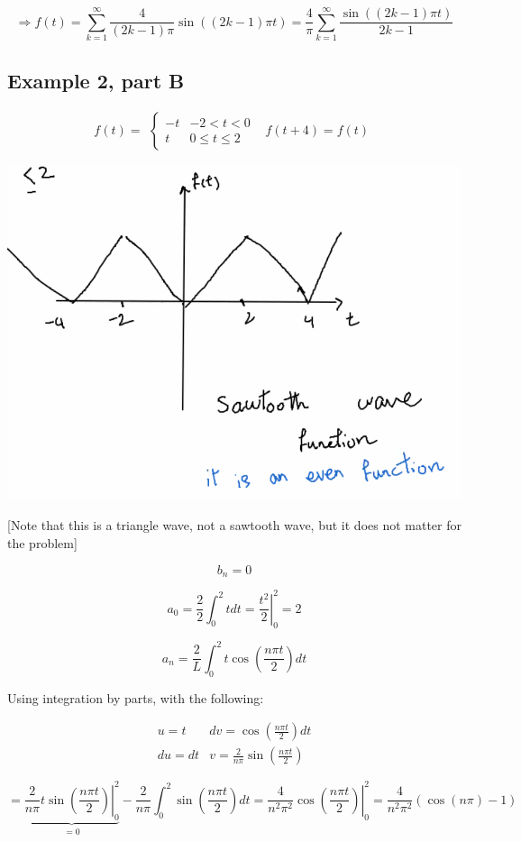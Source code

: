 $$\Rightarrow f(t) = \sum_{k = 1}^\infty \frac{4}{(2k-1) \pi} \sin \left( (2k-1) \pi t \right) = \frac{4}{\pi} \sum_{k = 1}^\infty \frac{\sin \left( (2k-1) \pi t \right)}{2k-1}$$

\subsection{Example 2, part B}

$$f(t) = \begin{matrix} \left\{ \begin{matrix} -t & -2 < t < 0 \\ t & 0 \leq t \leq 2 \end{matrix} \right. & f(t+4) = f(t) \end{matrix} $$

\includegraphics[width = 0.95 \textwidth]{image2.png}

[Note that this is a triangle wave, not a sawtooth wave, but it does not matter for the problem]

$$b_n = 0$$

$$a_0 = \frac{2}{2} \int_{0}^2 t dt = \left. \frac{t^2}{2} \right|_0^2 = 2$$

$$a_n = \frac{2}{L} \int_{0}^2 t \cos (\frac{n \pi t}{2}) dt$$

Using integration by parts, with the following:

$$\begin{matrix} u = t & dv = \cos(\frac{n \pi t}{2}) dt \\ du = dt & v = \frac{2}{n \pi} \sin(\frac{n \pi t}{2}) \end{matrix}$$

$$ = \underbrace{\left. \frac{2}{n \pi} t \sin(\frac{n \pi t}{2} ) \right|_0^2}_{ = 0} - \frac{2}{n \pi} \int_{0}^2 \sin(\frac{n \pi t}{2}) dt = \left. \frac{4}{n^2 \pi^2} \cos(\frac{n \pi t}{2}) \right|_0^2 = \frac{4}{n^2 \pi^2} (\cos(n \pi) - 1)$$

